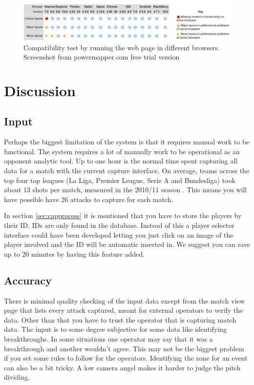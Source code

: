 \begin{figure}[ht!]
\centering
\includegraphics[width=1\textwidth]{images/evaluation/compa}
\caption{Compatibility test by running the web page in different browsers. Screenshot from powermapper.com free trial version}
\label{fig:compa}
\end{figure}

\section{Discussion}
\subsection{Input}

Perhaps the biggest limitation of the system is that it requires manual work to be functional. The system requires a lot of manually work to be operational as an opponent analytic tool. Up to one hour is the normal time spent capturing all data for a match with the current capture interface. On average, teams across the top four top leagues (La Liga, Premier League, Serie A and Bundesliga) took about 13 shots per match, measured in the 2010/11 season \cite{soccerbynumbers}. This means you will have possible have 26 attacks to capture for each match. 

In section \ref{sec:capprocess} it is mentioned that you have to store the players by their ID. IDs are only found in the database. Instead of this a player selector interface could have been developed letting you just click on an image of the player involved and the ID will be automatic inserted in. We suggest you can save up to 20 minutes by having this feature added.

\subsection{Accuracy}

There is minimal quality checking of the input data except from the match view page that lists every attack captured, meant for external operators to verify the data. Other than that you have to trust the operator that is capturing match data. The input is to some degree subjective for some data like identifying breakthroughs. In some situations one operator may say that it was a breakthrough and another wouldn't agree. This may not be the biggest problem if you set some rules to follow for the operators. Identifying the zone for an event can also be a bit tricky. A low camera angel makes it harder to judge the pitch dividing.  

